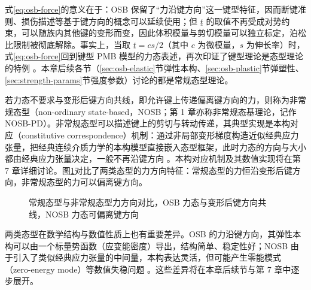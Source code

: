 式\eqref{eq:osb-force}的意义在于：OSB 保留了“力沿键方向”这一键型特征，因而断键准则、损伤描述等基于键方向的概念可以延续使用；但 $\underline{t}$ 的取值不再受成对势约束，可以随族内其他键的变形而变，因此体积模量与剪切模量可以独立标定，泊松比限制被彻底解除。事实上，当取 $\underline{t}=cs/2$（其中 $c$ 为微模量，$s$ 为伸长率）时，式\eqref{eq:osb-force}回到键型 PMB 模型的力态表述，再次印证了键型理论是态型理论的特例 \cite{Silling2007}。本章后续各节（\ref{sec:osb-elastic}节弹性本构、\ref{sec:osb-plastic}节弹塑性、\ref{sec:strength-params}节强度参数）讨论的都是常规态型理论。

若力态不要求与变形后键方向共线，即允许键上传递偏离键方向的力，则称为非常规态型（non-ordinary state-based，NOSB；第 1 章亦称非常规态基理论，记作 NOSB-PD）。非常规态型可以描述键上的剪切与转动传递，其典型实现是本构对应（constitutive correspondence）机制：通过非局部变形梯度构造近似经典应力张量，把经典连续介质力学的本构模型直接嵌入态型框架，此时力态的方向与大小都由经典应力张量决定，一般不再沿键方向 \cite{Silling2007,Javili2019}。本构对应机制及其数值实现将在第 7 章详细讨论。图\ref{fig:osb-nosb}对比了两类态型的力方向特征：常规态型的力恒沿变形后键方向，非常规态型的力可以偏离键方向。

\begin{figure}[htbp]
  \centering
  \caption{常规态型与非常规态型力方向对比，OSB 力态与变形后键方向共线，NOSB 力态可偏离键方向}
  \label{fig:osb-nosb}
\end{figure}

两类态型在数学结构与数值性质上也有重要差异。OSB 的力沿键方向，其弹性本构可以由一个标量势函数（应变能密度）导出，结构简单、稳定性好；NOSB 由于引入了类似经典应力张量的中间量，本构表达灵活，但可能产生零能模式（zero-energy mode）等数值失稳问题 \cite{Javili2019,Silling2017}。这些差异将在本章后续节与第 7 章中逐步展开。

